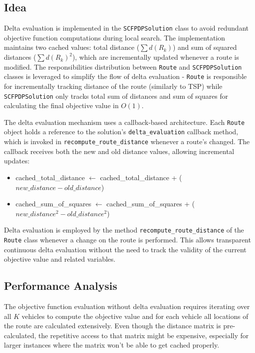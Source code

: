\documentclass[a4paper]{scrartcl}
\begin{document}
\subsection{Idea}
Delta evaluation is implemented in the \texttt{SCFPDPSolution} class to avoid redundant objective function computations during local search. The implementation maintains two cached values: total distance ($\sum d(R_k)$) and sum of squared distances ($\sum d(R_k)^2$), which are incrementally updated whenever a route is modified. The responsibilities distribution between \texttt{Route} and \texttt{SCFPDPSolution} classes is leveraged to simplify the flow of delta evaluation - \texttt{Route} is responsible for incrementally tracking distance of the route (similarly to TSP) while \texttt{SCFPDPSolution} only tracks total sum of distances and sum of squares for calculating the final objective value in $O(1)$. 

The delta evaluation mechanism uses a callback-based architecture. Each \texttt{Route} object holds a reference to the solution's \texttt{delta\_evaluation} callback method, which is invoked in \texttt{recompute\_route\_distance} whenever a route's changed. The callback receives both the new and old distance values, allowing incremental updates:

\begin{itemize}
\item cached\_total\_distance $\leftarrow$ cached\_total\_distance + ($new\_distance - old\_distance$)
\item cached\_sum\_of\_squares $\leftarrow$ cached\_sum\_of\_squares + ($new\_distance ^ 2 - old\_distance^2$)
\end{itemize}

Delta evaluation is employed by the method \texttt{recompute\_route\_distance} of the \texttt{Route} class whenever a change on the route is performed. This allows transparent continuous delta evaluation without the need to track the validity of the current objective value and related variables.

\subsection{Performance Analysis}

The objective function evaluation without delta evaluation requires iterating over all $K$ vehicles to compute the objective value and for each vehicle all locations of the route are calculated extensively. Even though the distance matrix is pre-calculated, the repetitive access to that matrix might be expensive, especially for larger instances where the matrix won't be able to get cached properly.
\end{document}
